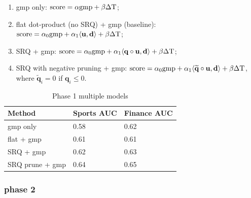 \documentclass{sig-alternate}
\newcommand{\bfd}{\mathbf{d}}
\newcommand{\bfu}{\mathbf{u}}
\newcommand{\bfq}{\mathbf{q}}
\begin{document}
\begin{enumerate}
\item gmp only: $\rm{score} = \alpha \rm{gmp} + \beta \Delta T$;
\item flat dot-product (no SRQ) + gmp (baseline): $\rm{score} = \alpha_0 \rm{gmp} + \alpha_1 \langle \bfu,\bfd\rangle + \beta \Delta T$;
\item SRQ + gmp: $\rm{score} = \alpha_0 \rm{gmp} + \alpha_1 \langle \bfq \circ \bfu, \bfd \rangle + \beta \Delta T$;
\item SRQ with negative pruning + gmp: $\rm{score} = \alpha_0 \rm{gmp} + \alpha_1 \langle \widetilde{\bfq} \circ \bfu, \bfd \rangle + \beta \Delta T$, where $\widetilde{\bfq}_i = 0$ if $\bfq_i \le 0$.
\end{enumerate}

\begin{table}
\caption{Phase 1 multiple models}
\label{tag:phase1exp}
\begin{tabular}{|l|l|l|}
\hline
Method & Sports AUC & Finance AUC\\ \hline
gmp only & 0.58 & 0.62 \\ \hline
flat + gmp & 0.61 & 0.61 \\ \hline
SRQ + gmp & 0.62 & 0.63 \\ \hline
SRQ prune + gmp & 0.64 & 0.65 \\ \hline
\end{tabular}

\end{table}

%
%


\subsubsection{phase 2}

\end{document}
